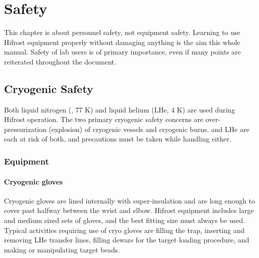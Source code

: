 \chapter{Safety} 
\label{safety}
This chapter is about personnel safety, not equipment safety.  Learning to use Hifrost equipment properly without damaging anything is the aim this whole manual.  Safety of lab users is of primary importance, even if many points are reiterated throughout the document.

\vspace{1cm}

\section{Cryogenic Safety}
Both liquid nitrogen (\lnn, 77 K) and liquid helium (LHe, 4 K) are used during Hifrost operation.  The two primary cryogenic safety concerns are over-pressurization (explosion) of cryogenic vessels and cryogenic burns.  \lnn{} and LHe are each at risk of both, and precautions must be taken while handling either. 
\subsection{Equipment}
\subsubsection{Cryogenic gloves}
Cryogenic gloves are lined internally with super-insulation and are long enough to cover past halfway between the wrist and elbow.  Hifrost equipment includes large and medium sized sets of gloves, and the best fitting size must always be used.  Typical activities requiring use of cryo gloves are filling the \lnn{} trap, inserting and removing LHe transfer lines, filling \lnn{} dewars for the target loading procedure, and making or manipulating target beads.

